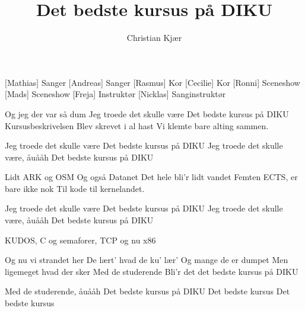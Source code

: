 \documentclass[a4paper,11pt]{article}
\title{Det bedste kursus på DIKU}
\author{Christian Kjær}
\begin{document}
\maketitle

\begin{roles}
[Mathias] Sanger
[Andreas] Sanger
[Rasmus] Kor
[Cecilie] Kor
[Ronni] Sceneshow
[Mads] Sceneshow
[Freja] Instruktør
[Nicklas] Sanginstruktør
\end{roles}

\begin{song}
%
Og jeg der var så dum
Jeg troede det skulle være
Det bedste kursus på DIKU
Kursusbeskrivelsen
Blev skrevet i al hast
Vi klemte bare alting sammen.

Jeg troede det skulle være
Det bedste kursus på DIKU
Jeg troede det skulle være, åuååh
Det bedste kursus på DIKU

Lidt ARK og OSM
Og også Datanet
Det hele bli'r lidt vandet
Femten ECTS, er bare ikke nok
Til kode til kernelandet.

Jeg troede det skulle være
Det bedste kursus på DIKU
Jeg troede det skulle være, åuååh
Det bedste kursus på DIKU

KUDOS, C og semaforer, TCP og nu x86

Og nu vi strandet her
De lært' hvad de ku' lær'
Og mange de er dumpet
Men ligemeget hvad der sker
Med de studerende
Bli'r det det bedste kursus på DIKU

Med de studerende, åuååh
Det bedste kursus på DIKU
Det bedste kursus
Det bedste kursus
\end{song}
\end{document}
